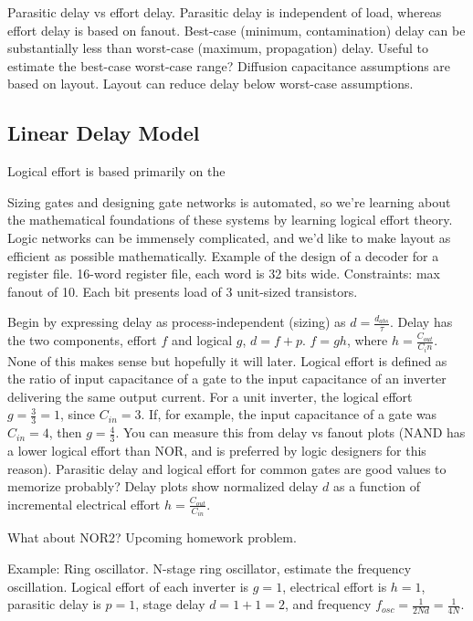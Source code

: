 \documentclass{article}
\begin{document}
Parasitic delay vs effort delay. Parasitic delay is independent of load, whereas effort delay is based on fanout. Best-case (minimum, contamination) delay can be substantially less than worst-case (maximum, propagation) delay. Useful to estimate the best-case worst-case range? Diffusion capacitance assumptions are based on layout. Layout can reduce delay below worst-case assumptions. 

\subsection{Linear Delay Model	}

Logical effort is based primarily on the 

Sizing gates and designing gate networks is automated, so we're learning about the mathematical foundations of these systems by learning logical effort theory. Logic networks can be immensely complicated, and we'd like to make layout as efficient as possible mathematically. Example of the design of a decoder for a register file. 16-word register file, each word is 32 bits wide. Constraints: max fanout of 10. Each bit presents load of 3 unit-sized transistors. 

Begin by expressing delay as process-independent (sizing) as \(d=\frac{d_{abs}}{\tau}\). Delay has the two components, effort \(f\) and logical \(g\), \(d = f+p\). \(f = gh\), where \(h = \frac{C_{out}}{C_in}\). None of this makes sense but hopefully it will later. Logical effort is defined as the ratio of input capacitance of a gate to the input capacitance of an inverter delivering the same output current. For a unit inverter, the logical effort \(g = \frac{3}{3} = 1\), since \(C_{in} = 3\). If, for example, the input capacitance of a gate was \(C_{in} = 4\), then \(g=\frac{4}{3}.\) You can measure this from delay vs fanout plots (NAND has a lower logical effort than NOR, and is preferred by logic designers for this reason). Parasitic delay and logical effort for common gates are good values to memorize probably? Delay plots show normalized delay \(d\) as a function of incremental electrical effort \(h = \frac{C_{out}}{C_{in}}.\) 

What about NOR2? Upcoming homework problem.

Example: Ring oscillator. N-stage ring oscillator, estimate the frequency oscillation. Logical effort of each inverter is \(g=1\), electrical effort is \(h=1\), parasitic delay is \(p=1\), stage delay \(d=1+1=2\), and frequency \(f_{osc} = \frac{1}{2Nd} = \frac{1}{4N}.\)
\end{document}
